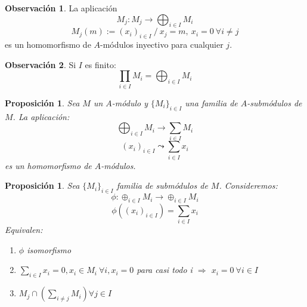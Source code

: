 \documentclass{article}
\theoremstyle{theorem-style}  %
\newtheorem{proposition}[theorem]{Proposición}
\theoremstyle{definition}
\newtheorem*{observation}{Observación} %
\theoremstyle{example-style}
\begin{document}
\begin{observation}
	La aplicación
	\[M_j:M_j\longrightarrow\bigoplus_{i\in I}M_i\]
	\[M_j(m):= (x_i)_{i\in I} \ / \ x_j=m,\  x_i=0 \ \forall i\neq j \]
	es un homomorfismo de $A$-módulos inyectivo para cualquier $j$.
\end{observation}

\begin{observation}
	Si $I$ es finito:
	\[\prod_{i\in I}M_i = \bigoplus_{i\in I}M_i \]
\end{observation}

\begin{proposition}
	Sea $M$ un $A$-módulo y $\{M_i\}_{i\in I}$ una familia de $A$-submódulos de $M$. La aplicación:
	\[ \bigoplus_{i\in I}M_i \longrightarrow \sum_{i\in I}M_i \]
	\[ (x_i)_{i\in I} \leadsto \sum_{i\in I}x_i \]
	es un homomorfismo de $A$-módulos.
\end{proposition}

\begin{proposition}
	Sea $ \{M_i\}_{i\in I} $ familia de submódulos de $ M $. Consideremos:
	\[\phi : \oplus_{i\in I} M_i\longrightarrow \oplus_{i\in I }M_i \]
	\[\phi ((x_i)_{i\in I})=\sum_{i\in I} x_i \]
	Equivalen:
	\begin{enumerate}[\hspace{1cm}i)]
		\item $\phi$ isomorfismo
		\item $\sum_{i\in I}x_i=0,x_i \in M_i \ \forall i, x_i=0$ para casi todo i $\Rightarrow$ $ x_i=0 \ \forall i \in I $
		\item $M_j \cap (\sum_{i\neq j}M_i)\forall j \in I$
	\end{enumerate}
\end{proposition}
\end{document}
